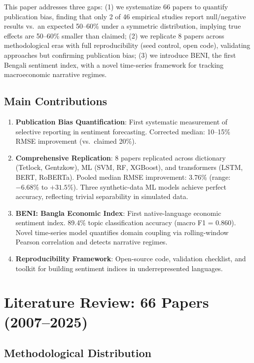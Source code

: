 \documentclass[11pt]{article}
\begin{document}
This paper addresses three gaps: (1) we systematize 66 papers to quantify publication bias, finding that only 2 of 46 empirical studies report null/negative results vs.\ an expected 50--60\% under a symmetric distribution, implying true effects are 50--60\% smaller than claimed; (2) we replicate 8 papers across methodological eras with full reproducibility (seed control, open code), validating approaches but confirming publication bias; (3) we introduce BENI, the first Bengali sentiment index, with a novel time-series framework for tracking macroeconomic narrative regimes.

\subsection{Main Contributions}

\begin{enumerate}
\item \textbf{Publication Bias Quantification}: First systematic measurement of selective reporting in sentiment forecasting. Corrected median: 10--15\% RMSE improvement (vs.\ claimed 20\%).

\item \textbf{Comprehensive Replication}: 8 papers replicated across dictionary (Tetlock, Gentzkow), ML (SVM, RF, XGBoost), and transformers (LSTM, BERT, RoBERTa). Pooled median RMSE improvement: 3.76\% (range: \(-6.68\%\) to \(+31.5\%\)). Three synthetic-data ML models achieve perfect accuracy, reflecting trivial separability in simulated data.

\item \textbf{BENI: Bangla Economic Index}: First native-language economic sentiment index. 89.4\% topic classification accuracy (macro F1 = 0.860). Novel time-series model quantifies domain coupling via rolling-window Pearson correlation and detects narrative regimes.

\item \textbf{Reproducibility Framework}: Open-source code, validation checklist, and toolkit for building sentiment indices in underrepresented languages.
\end{enumerate}

\section{Literature Review: 66 Papers (2007--2025)}

\subsection{Methodological Distribution}
\end{document}
